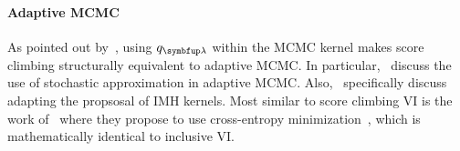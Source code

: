 \paragraph{Adaptive MCMC}
As pointed out by~\citet{pmlr-v124-ou20a}, using \(q_{\vlambda}\) within the MCMC kernel makes score climbing structurally equivalent to adaptive MCMC.
In particular,~\citet{10.1007/s11222-008-9110-y, garthwaite_adaptive_2016} discuss the use of stochastic approximation in adaptive MCMC.
Also,~\citet{andrieu_ergodicity_2006, keith_adaptive_2008, holden_adaptive_2009, giordani_adaptive_2010} specifically discuss adapting the propsosal of IMH kernels.
Most similar to score climbing VI is the work of~\citet{keith_adaptive_2008} where they propose to use cross-entropy minimization~\citep{barbakh_cross_2009}, which is mathematically identical to inclusive VI.


